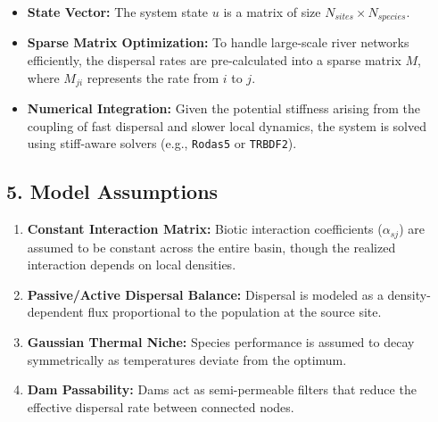 \begin{itemize}
\tightlist
\item
  \textbf{State Vector:} The system state \(u\) is a matrix of size
  \(N_{sites} \times N_{species}\).
\item
  \textbf{Sparse Matrix Optimization:} To handle large-scale river
  networks efficiently, the dispersal rates are pre-calculated into a
  sparse matrix \(M\), where \(M_{ji}\) represents the rate from \(i\)
  to \(j\).
\item
  \textbf{Numerical Integration:} Given the potential stiffness arising
  from the coupling of fast dispersal and slower local dynamics, the
  system is solved using stiff-aware solvers (e.g., \texttt{Rodas5} or
  \texttt{TRBDF2}).
\end{itemize}

\hypertarget{model-assumptions}{%
\subsection{5. Model Assumptions}\label{model-assumptions}}

\begin{enumerate}
\def\labelenumi{\arabic{enumi}.}
\tightlist
\item
  \textbf{Constant Interaction Matrix:} Biotic interaction coefficients
  (\(\alpha_{sj}\)) are assumed to be constant across the entire basin,
  though the realized interaction depends on local densities.
\item
  \textbf{Passive/Active Dispersal Balance:} Dispersal is modeled as a
  density-dependent flux proportional to the population at the source
  site.
\item
  \textbf{Gaussian Thermal Niche:} Species performance is assumed to
  decay symmetrically as temperatures deviate from the optimum.
\item
  \textbf{Dam Passability:} Dams act as semi-permeable filters that
  reduce the effective dispersal rate between connected nodes.
\end{enumerate}
